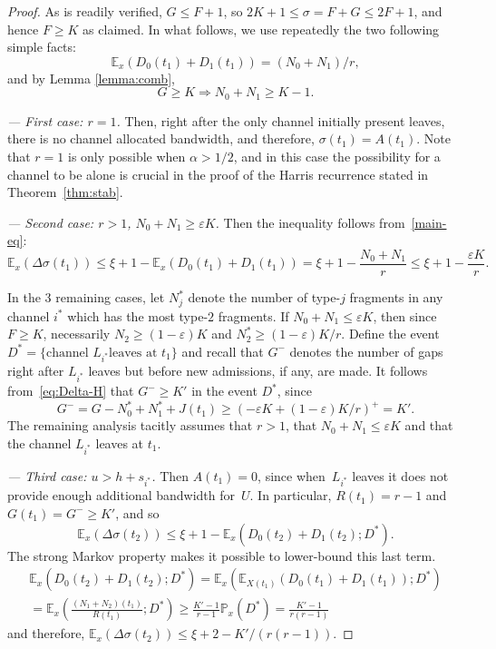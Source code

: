 \documentclass{amsart}
\def\E{\mathbb{E}}
\def\P{\mathbb{P}}
\begin{document}
\begin{proof}
As is readily verified, $G \leq F+1$, so $2K+1 \leq \sigma = F + G
\leq 2F + 1$, and hence $F \geq K$ as claimed. In what follows, we
use repeatedly the two following simple facts:
\begin{equation}
 \label{sf:2}
\E_x \left( D_0(t_1) + D_1(t_1) \right) = (N_0 + N_1) / r,
\end{equation}
and by Lemma \ref{lemma:comb},
\begin{equation}
\label{sf:1} G \geq K \Rightarrow N_0 + N_1 \geq K - 1.
\end{equation}

\noindent \textit{{--- First case: $r = 1$.}} Then, right after the
only channel initially present leaves, there is no channel allocated bandwidth, and
therefore, $\sigma(t_1) = A(t_1)$. Note that $r = 1$ is only possible
when $\alpha > 1/2$, and in this case the possibility for a channel
to be alone is crucial in the proof of the Harris recurrence
stated in Theorem~\ref{thm:stab}.



\noindent \textit{{--- Second case: $r > 1$, $N_0 + N_1 \geq \varepsilon
K$.}} Then the inequality follows from~\eqref{main-eq}:
\[
    \E_x(\Delta \sigma(t_1)) \leq \xi + 1 - \E_x(D_0(t_1) + D_1(t_1))
    = \xi + 1 - \frac{N_0 + N_1}{r} \leq \xi + 1 - \frac{\varepsilon K}{r}.
\]


In the 3 remaining cases, let $N^*_j$ denote the number of type-$j$
fragments in any channel $i^*$ which has the most type-$2$
fragments. If $N_0 + N_1 \leq \varepsilon K$, then since $F \geq K$,
necessarily $N_2 \geq (1-\varepsilon) K$ and $N^*_2 \geq
(1-\varepsilon)K/r.$
  Define the event $D^* = \{ \text{channel } L_{i^*} \text{
leaves at } t_1 \}$ and recall that $G^-$ denotes the number of gaps
right after $L_{i^*}$ leaves but before new admissions, if any, are
made. It follows from~\eqref{eq:Delta-H} that $G^- \geq K'$ in the
event $D^*$, since
    \[ G^- = G - N^*_0 + N^*_1 + J(t_1)
    \geq \left (- \varepsilon K + (1-\varepsilon)K / r \right)^+ = K'. \]
The remaining analysis tacitly assumes that $r>1$, that $N_0 + N_1 \leq
\varepsilon K$ and that the channel $L_{i^*}$ leaves at $t_1$.


\noindent \textit{{--- Third case: $u > h + s_{i^*}$.}} Then $A(t_1)
= 0$, since when~$L_{i^*}$ leaves it does not provide enough
additional bandwidth for~$U$. In particular, $R(t_1) = r-1$ and
$G(t_1) = G^- \geq K'$, and so
    \[
    \E_x(\Delta \sigma(t_2))\leq \xi + 1 - \E_x(D_0(t_2) + D_1(t_2); D^*).
    \]
The strong Markov property makes it possible to lower-bound this
last term.
\begin{multline*}
\E_x(D_0(t_2) + D_1(t_2); D^*) = \E_x(\E_{X(t_1)}(D_0(t_1) + D_1(t_1)) ; D^*)\\
= \E_x \left(\frac{(N_1 + N_2)(t_1)}{R(t_1)} ; D^* \right) \geq
\frac{K' - 1}{r - 1} \P_x (D^*) = \frac{K' - 1}{r(r - 1)}
\end{multline*}
and therefore, $\E_x(\Delta \sigma(t_2)) \leq \xi + 2 - K' /
(r(r-1))$.



\end{proof}
\end{document}
